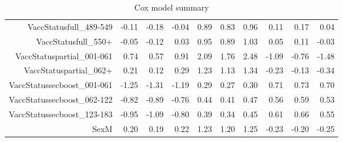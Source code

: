 \begin{table}[ht]
\begin{tabular}{rrrrrrrrrr}
  VaccStatusfull\_489-549 & -0.11 & -0.18 & -0.04 & 0.89 & 0.83 & 0.96 & 0.11 & 0.17 & 0.04 \\ 
  VaccStatusfull\_550+ & -0.05 & -0.12 & 0.03 & 0.95 & 0.89 & 1.03 & 0.05 & 0.11 & -0.03 \\ 
  VaccStatuspartial\_001-061 & 0.74 & 0.57 & 0.91 & 2.09 & 1.76 & 2.48 & -1.09 & -0.76 & -1.48 \\ 
  VaccStatuspartial\_062+ & 0.21 & 0.12 & 0.29 & 1.23 & 1.13 & 1.34 & -0.23 & -0.13 & -0.34 \\ 
  VaccStatussecboost\_001-061 & -1.25 & -1.31 & -1.19 & 0.29 & 0.27 & 0.30 & 0.71 & 0.73 & 0.70 \\ 
  VaccStatussecboost\_062-122 & -0.82 & -0.89 & -0.76 & 0.44 & 0.41 & 0.47 & 0.56 & 0.59 & 0.53 \\ 
  VaccStatussecboost\_123-183 & -0.95 & -1.09 & -0.80 & 0.39 & 0.34 & 0.45 & 0.61 & 0.66 & 0.55 \\ 
  SexM & 0.20 & 0.19 & 0.22 & 1.23 & 1.20 & 1.25 & -0.23 & -0.20 & -0.25 \\ 
   \hline
\end{tabular}
\caption{Cox model summary} 
\end{table}

